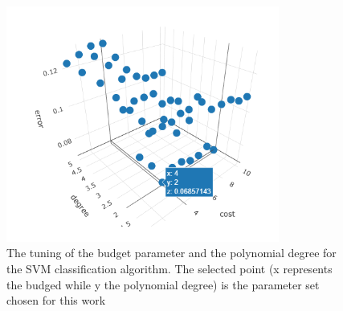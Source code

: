 \documentclass[
12pt, %
a4paper, %
oneside, %
headinclude,footinclude, %
BCOR5mm, %
]{scrartcl}
\begin{document}
\begin{figure}[h]
\begin{center}
\includegraphics[width=0.8\textwidth]{Pic/SVM_tuning.png}
\caption{The tuning of the budget parameter and the polynomial degree for the SVM classification algorithm. The selected point (x represents the budged while y the polynomial degree) is the parameter set chosen for this work}
\label{SVM_tuning}
\end{center}
\end{figure}
\end{document}
